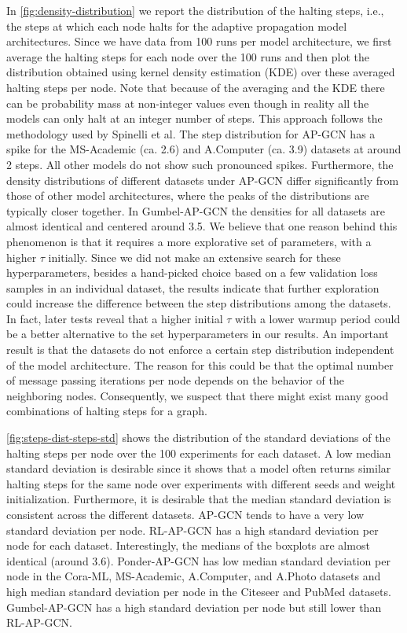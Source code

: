 \documentclass{gdl}
\begin{document}
In \autoref{fig:density-distribution} we report the distribution of the halting steps, i.e., the steps at which each node halts for the adaptive propagation model architectures. Since we have data from 100 runs per model architecture, we first average the halting steps for each node over the 100 runs and then plot the distribution obtained using kernel density estimation (KDE) over these averaged halting steps per node. Note that because of the averaging and the KDE there can be probability mass at non-integer values even though in reality all the models can only halt at an integer number of steps. This approach follows the methodology used by Spinelli et al. The step distribution for AP-GCN has a spike for the MS-Academic (ca. 2.6) and A.Computer (ca. 3.9) datasets at around 2 steps. All other models do not show such pronounced spikes. Furthermore,  the density distributions of different datasets under AP-GCN differ significantly from those of other model architectures, where the peaks of the distributions are typically closer together. In Gumbel-AP-GCN the densities for all datasets are almost identical and centered around 3.5. We believe that one reason behind this phenomenon is that it requires a more explorative set of parameters, with a higher $\tau$ initially. Since we did not make an extensive search for these hyperparameters, besides a hand-picked choice based on a few validation loss samples in an individual dataset, the results indicate that further exploration could increase the difference between the step distributions among the datasets. In fact, later tests reveal that a higher initial $\tau$ with a lower warmup period could be a better alternative to the set hyperparameters in our results.  
An important result is that the datasets do not enforce a certain step distribution independent of the model architecture. The reason for this could be that the optimal number of message passing iterations per node depends on the behavior of the neighboring nodes. Consequently, we suspect that there might exist many good combinations of halting steps for a graph.

\autoref{fig:steps-dist-steps-std} shows the distribution of the standard deviations of the halting steps per node over the 100 experiments for each dataset. A low median standard deviation is desirable since it shows that a model often returns similar halting steps for the same node over experiments with different seeds and weight initialization. Furthermore, it is desirable that the median standard deviation is consistent across the different datasets. AP-GCN tends to have a very low standard deviation per node. RL-AP-GCN has a high standard deviation per node for each dataset. Interestingly, the medians of the boxplots are almost identical (around 3.6). Ponder-AP-GCN has low median standard deviation per node in the Cora-ML, MS-Academic, A.Computer, and A.Photo datasets and high median standard deviation per node in the Citeseer and PubMed datasets. Gumbel-AP-GCN has a high standard deviation per node but still lower than RL-AP-GCN. 
\end{document}
